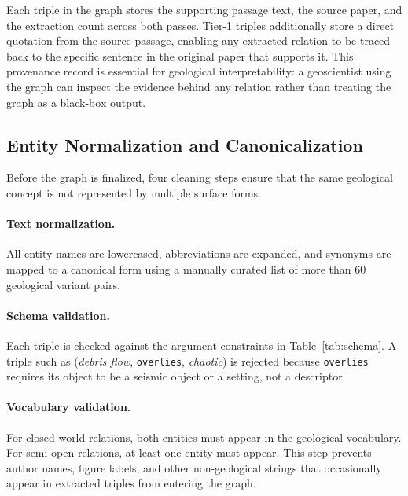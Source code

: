 \documentclass[10pt]{article}
\newcommand{\pred}[1]{\texttt{\small #1}}
\begin{document}
Each triple in the graph stores the supporting passage text,
the source paper, and the extraction count across both passes.
Tier-1 triples additionally store a direct quotation from
the source passage, enabling any extracted relation to be
traced back to the specific sentence in the original paper
that supports it.
This provenance record is essential for geological
interpretability: a geoscientist using the graph can inspect
the evidence behind any relation rather than treating the
graph as a black-box output.

\subsection{Entity Normalization and Canonicalization}
\label{sec:canonicalization}

Before the graph is finalized, four cleaning steps ensure
that the same geological concept is not represented by
multiple surface forms.

\paragraph{Text normalization.}
All entity names are lowercased, abbreviations are expanded,
and synonyms are mapped to a canonical form using a manually
curated list of more than 60 geological variant pairs.

\paragraph{Schema validation.}
Each triple is checked against the argument constraints in
Table~\ref{tab:schema}.
A triple such as (\emph{debris flow}, \pred{overlies},
\emph{chaotic}) is rejected because \pred{overlies} requires
its object to be a seismic object or a setting, not a
descriptor.

\paragraph{Vocabulary validation.}
For closed-world relations, both entities must appear in the
geological vocabulary.
For semi-open relations, at least one entity must appear.
This step prevents author names, figure labels, and other
non-geological strings that occasionally appear in extracted
triples from entering the graph.
\end{document}
